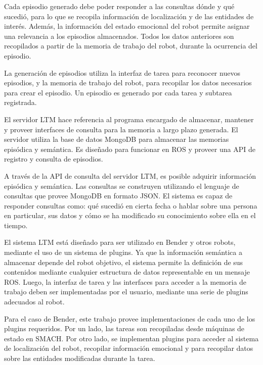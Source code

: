 Cada episodio generado debe poder responder a las consultas dónde y qué sucedió, para lo que se recopila información de localización y de las entidades de interés. Además, la información del estado emocional del robot permite asignar una relevancia a los episodios almacenados.  Todos los datos anteriores son recopilados a partir de la memoria de trabajo del robot, durante la ocurrencia del episodio.

La generación de episodios utiliza la interfaz de tarea para reconocer nuevos episodios, y la memoria de trabajo del robot, para recopilar los datos necesarios para crear el episodio. Un episodio es generado por cada tarea y subtarea registrada.

El servidor LTM hace referencia al programa encargado de almacenar, mantener y proveer interfaces de consulta para la memoria a largo plazo generada. El servidor utiliza la base de datos MongoDB para almacenar las memorias episódica y semántica. Es diseñado para funcionar en ROS y proveer una API de registro y consulta de episodios.

A través de la API de consulta del servidor LTM, es posible adquirir información episódica y semántica. Las consultas se construyen utilizando el lenguaje de consultas que provee MongoDB en formato JSON. El sistema es capaz de responder consultas como: qué sucedió en cierta fecha o hablar sobre una persona en particular, sus datos y cómo se ha modificado su conocimiento sobre ella en el tiempo.

El sistema LTM está diseñado para ser utilizado en Bender y otros robots, mediante el uso de un sistema de plugins. Ya que la información semántica a almacenar depende del robot objetivo, el sistema permite la definición de sus contenidos mediante cualquier estructura de datos representable en un mensaje ROS. Luego, la interfaz de tarea y las interfaces para acceder a la memoria de trabajo deben ser implementadas por el usuario, mediante una serie de plugins adecuados al robot. 

Para el caso de Bender, este trabajo provee implementaciones de cada uno de los plugins requeridos. Por un lado, las tareas son recopiladas desde máquinas de estado en SMACH. Por otro lado, se implementan plugins para acceder al sistema de localización del robot, recopilar información emocional y para recopilar datos sobre las entidades modificadas durante la tarea.




